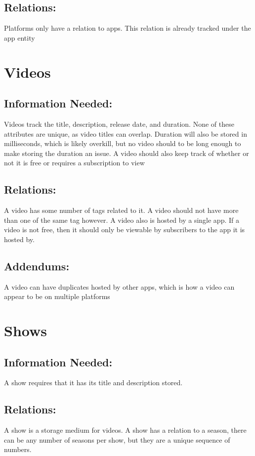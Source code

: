 \documentclass{neu_handout}
\begin{document}
\subsection{Relations:}
Platforms only have a relation to apps. This relation is already tracked under the app entity

\section{Videos}

\subsection{Information Needed:}
Videos track the title, description, release date, and duration. None of these attributes are unique, as video titles can overlap. Duration will also be stored in milliseconds, which is likely overkill, but no video should to be long enough to make storing the duration an issue. A video should also keep track of whether or not it is free or requires a subscription to view

\subsection{Relations:}
A video has some number of tags related to it. A video should not have more than one of the same tag however. A video also is hosted by a single app. If a video is not free, then it should only be viewable by subscribers to the app it is hosted by. 

\subsection{Addendums:}
A video can have duplicates hosted by other apps, which is how a video can appear to be on multiple platforms

\section{Shows}

\subsection{Information Needed:}
A show requires that it has its title and description stored. 

\subsection{Relations:}
A show is a storage medium for videos. A show has a relation to a season, there can be any number of seasons per show, but they are a unique sequence of numbers.
\end{document}
